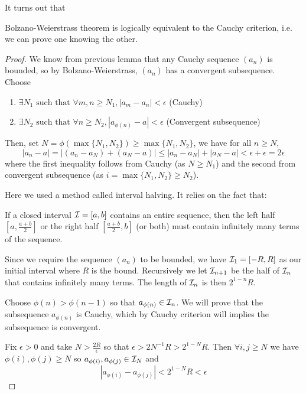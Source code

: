 \documentclass[11pt]{article}
\begin{document}
It turns out that 
\begin{theorem}
  Bolzano-Weierstrass theorem is logically equivalent to the Cauchy criterion, i.e. we can prove one knowing the other.
\end{theorem}
\begin{proof}
We know from previous lemma that any Cauchy sequence \((a_n)\) is bounded, so by Bolzano-Weierstrass, \((a_n)\) has a convergent subsequence. Choose 
\begin{enumerate}
  \item \(\exists N_1 \text{ such that } \forall m,n\geq N_1,|a_m-a_n|<\epsilon\) (Cauchy)
  \item \(\exists N_2 \text{ such that } \forall n\geq N_2,|a_{\phi(n)}-a|<\epsilon\) (Convergent subsequence)
\end{enumerate}
Then, set \(N=\phi(\max\{N_1,N_2\})\geq\max\{N_1,N_2\}\), we have for all \(n\geq N\),
\[|a_n-a|=|(a_n-a_N)+(a_N-a)|\leq|a_n-a_N|+|a_N-a|<\epsilon+\epsilon=2\epsilon\]
where the first inequality follows from Cauchy (as \(N\geq N_1\)) and the second from convergent subsequence (as \(i=\max\{N_1,N_2\}\geq N_2\)).

Here we used a method called interval halving. It relies on the fact that: 
\begin{displayquote}
  If a closed interval \(\cal{I}=[a,b]\) contains an entire sequence, then the left half \([a,\frac{a+b}{2}]\) or the right half \([\frac{a+b}{2},b]\) (or both) must contain infinitely many terms of the sequence.
\end{displayquote}

Since we require the sequence \((a_n)\) to be bounded, we have \(\cal{I}_1=[-R,R]\) as our initial interval where \(R\) is the bound. Recursively we let \(\cal{I}_{n+1}\) be the half of \(\cal{I}_{n}\) that contains infinitely many terms. The length of \(\cal{I}_n\) is then \(2^{1-n}R\).

Choose \(\phi(n)>\phi(n-1)\) so that \(a_{\phi(n)}\in\cal{I}_n\). We will prove that the subsequence \(a_{\phi(n)}\) is Cauchy, which by Cauchy criterion will implies the subsequence is convergent.

Fix \(\epsilon>0\) and take \(N>\frac{2R}{\epsilon}\) so that \(\epsilon>2N^{-1}R>2^{1-N}R\). Then \(\forall i,j\geq N\) we have \(\phi(i),\phi(j)\geq N\) so \(a_{\phi(i)},a_{\phi(j)}\in\cal{I}_N\) and \[|a_{\phi(i)}-a_{\phi(j)}|<2^{1-N}R<\epsilon\]
\end{proof}
\end{document}
